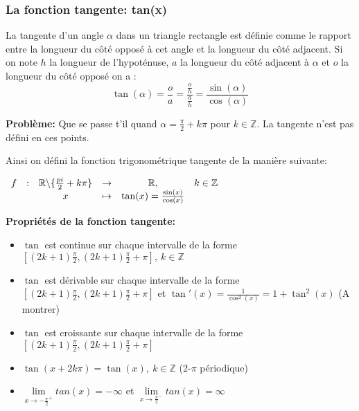 \subsubsection{La fonction tangente: tan(x)}
La tangente d'un angle $\alpha$ dans un triangle rectangle est définie comme
le rapport entre la longueur du côté opposé à cet angle et la
longueur du côté adjacent. Si on note $h$ la longueur de l'hypoténuse,
$a$ la longueur du côté adjacent à $\alpha$ et $o$ la longueur du côté
opposé on a :
\[
  \tan(\alpha) = \frac{o}{a} = \frac{\frac{o}{h}}{\frac{a}{h}} =
  \frac{\sin(\alpha)}{\cos(\alpha)}
\]

\textbf{Problème: } Que se passe t'il quand $\alpha = \frac{\pi}{2} +
k\pi$ pour $k \in \mathbb{Z}$. La tangente n'est pas défini en ces
points.

Ainsi on défini la fonction trigonométrique tangente de la manière
suivante:

\begin{center}
  $\begin{array}{cccccc}
     f & : & \mathbb{R} \backslash \{ \frac{pi}{2} + k \pi \} & \to & \mathbb{R}, &
       k \in \mathbb{Z}\\
       & & x & \mapsto & \tan(x)=\frac{\sin(x)}{\cos(x)} \\
   \end{array}$
 \end{center}

\textbf{Propriétés de la fonction tangente: }
\begin{itemize}[label=$\bullet$, leftmargin=2cm]
\item $\tan$ est continue sur chaque intervalle de la forme
  $[(2k+1)\frac{\pi}{2}, (2k+1)\frac{\pi}{2} + \pi],~ k \in \mathbb{Z}$
\item $\tan$ est dérivable sur chaque intervalle de la forme
  $[(2k+1)\frac{\pi}{2}, (2k+1)\frac{\pi}{2} + \pi]$ et $\tan'(x)
  =\frac{1}{\cos^2(x)} = 1+\tan^2(x)$ (A montrer)
\item $\tan$ est croissante sur chaque intervalle de la forme
  $[(2k+1)\frac{\pi}{2}, (2k+1)\frac{\pi}{2} + \pi]$ 
\item $\tan(x+2k\pi) = \tan(x),~ k \in \mathbb{Z}$ (2-$\pi$
  périodique)
\item $\lim \limits_{x \to -\frac{\pi}{2}^+} tan(x) = -\infty$ et $\lim
  \limits_{x \to \frac{\pi}{2}^-} tan(x) = \infty$ 
\end{itemize}

\vspace{1\baselineskip}

